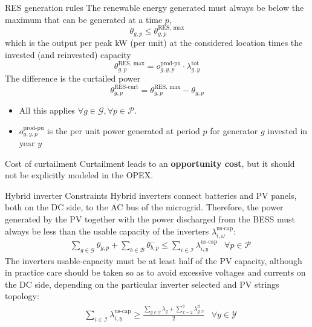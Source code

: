 \begin{frame}[allowframebreaks]{RES generation rules}
The renewable energy generated must always be below the maximum that can be generated at a time $p$, 
$$\theta_{g, p} \leq \theta^{\text{RES, max}}_{g,p}$$
which is the output per peak kW (per unit) at the considered location times the invested (and reinvested) capacity
$$\theta^{\text{RES, max}}_{g,p} = o^{\text{prod-pu}}_{g,y,p} \cdot \lambda_{g, y}^{\text{tot}} $$
The difference is the curtailed power
$$\theta^{\text{RES-curt}}_{g,p} = \theta^{\text{RES, max}}_{g,p} -  \theta_{g,p}$$
\begin{itemize}
\item All this applies $\forall  g \in \mathcal{G}, \forall  p \in \mathcal{P}$.
\item $o^{\text{prod-pu}}_{g,y,p}$ is the per unit power generated at period $p$ for generator $g$ invested in year $y$ 
\end{itemize}

\begin{block}{Cost of curtailment}
Curtailment leads to an \textbf{opportunity cost}, but it should not be explicitly modeled in the OPEX.    
\end{block}

\end{frame}




\begin{frame}{Hybrid inverter Constraints}
Hybrid inverters connect batteries and PV panels, both on the DC side, to the AC bus of the microgrid.
Therefore, the power generated by the PV together with the power discharged from the BESS must always be less than the usable capacity of the inverters $\lambda_{i, \omega}^{\text{us-cap}}$: 
\begin{align}
    &\sum_{g \in \mathcal{G}}  \theta_{g,p} + \sum_{b \in \mathcal{B}} \theta_{b,p}^{-} \leq \sum_{i \in \mathcal{I}} \lambda_{i,y}^{\text{us-cap}} & \forall  p \in \mathcal{P}
\end{align}
The inverters usable-capacity must be at least half of the PV capacity, although in practice care should be taken so as to avoid excessive voltages and currents on the DC side, depending on the particular inverter selected and PV strings topology:
\begin{align}
    &\sum_{i \in \mathcal{I}} \lambda_{i, y}^{\text{us-cap}} \geq \frac{\sum_{g \in \mathcal{G}}  \lambda_{g} + \sum_{x=2}^{y}
\lambda_{g, x}^{\text{ri}} }{2} &  \forall  y \in \mathcal{Y}
    \label{Constraint:inverter_pv}
\end{align}
\end{frame}

